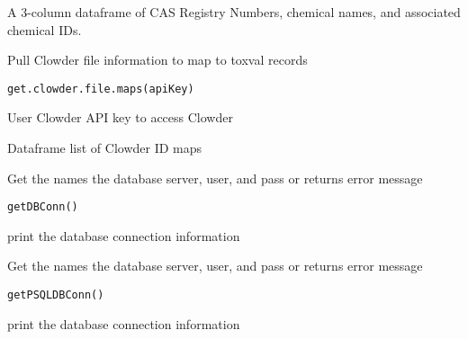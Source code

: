 \documentclass[letterpaper]{book}
\begin{document}
%
\begin{Value}
A 3-column dataframe of CAS Registry Numbers, chemical names, and associated chemical IDs.
\end{Value}
%
\begin{Description}\relax
Pull Clowder file information to map to toxval records
\end{Description}
%
\begin{Usage}
\begin{verbatim}
get.clowder.file.maps(apiKey)
\end{verbatim}
\end{Usage}
%
\begin{Arguments}
\begin{ldescription}
\item[\code{apiKey}] User Clowder API key to access Clowder
\end{ldescription}
\end{Arguments}
%
\begin{Value}
Dataframe list of Clowder ID maps
\end{Value}
%
\begin{Description}\relax
Get the names the database server, user, and pass or returns error message
\end{Description}
%
\begin{Usage}
\begin{verbatim}
getDBConn()
\end{verbatim}
\end{Usage}
%
\begin{Value}
print the database connection information
\end{Value}
%
\begin{Description}\relax
Get the names the database server, user, and pass or returns error message
\end{Description}
%
\begin{Usage}
\begin{verbatim}
getPSQLDBConn()
\end{verbatim}
\end{Usage}
%
\begin{Value}
print the database connection information
\end{Value}
\end{document}
